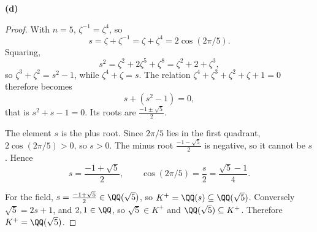 \documentclass[11pt]{article}
\begin{document}
\noindent\textbf{(d)}
\begin{proof}
With $n=5$, $\zeta^{-1}=\zeta^{4}$, so
\[
s=\zeta+\zeta^{-1}=\zeta+\zeta^{4}=2\cos(2\pi/5).
\]
Squaring,
\[
s^{2}=\zeta^{2}+2\zeta^{5}+\zeta^{8}=\zeta^{2}+2+\zeta^{3},
\]
so $\zeta^{3}+\zeta^{2}=s^{2}-1$, while $\zeta^{4}+\zeta=s$. The relation $\zeta^{4}+\zeta^{3}+\zeta^{2}+\zeta+1=0$ therefore becomes
\[
s+(s^{2}-1)=0,
\]
that is $s^{2}+s-1=0$. Its roots are $\tfrac{-1\pm\sqrt5}{2}$.

The element $s$ is the plus root. Since $2\pi/5$ lies in the first quadrant, $2\cos(2\pi/5)>0$, so $s>0$. The minus root $\tfrac{-1-\sqrt5}{2}$ is negative, so it cannot be $s$. Hence
\[
s=\frac{-1+\sqrt5}{2},\qquad \cos(2\pi/5)=\frac{s}{2}=\frac{\sqrt5-1}{4}.
\]

For the field, $s=\tfrac{-1+\sqrt5}{2}\in\QQ(\sqrt5)$, so $K^{+}=\QQ(s)\subseteq\QQ(\sqrt5)$. Conversely $\sqrt5=2s+1$, and $2,1\in\QQ$, so $\sqrt5\in K^{+}$ and $\QQ(\sqrt5)\subseteq K^{+}$. Therefore $K^{+}=\QQ(\sqrt5)$.
\end{proof}
\end{document}

